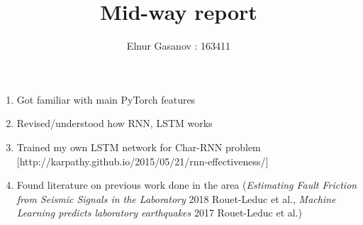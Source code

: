 \documentclass{article}
\author{Elnur Gasanov : 163411}
\title{Mid-way report}
\date{}
\begin{document}
\maketitle

\begin{enumerate}
	\item Got familiar with main PyTorch features
	\item Revised/understood how RNN, LSTM works
	\item Trained my own LSTM network for Char-RNN problem [http://karpathy.github.io/2015/05/21/rnn-effectiveness/]
	\item Found literature on previous work done in the area (\textit{Estimating Fault Friction from Seismic Signals in the Laboratory} 2018 Rouet-Leduc et al., \textit{Machine Learning predicts laboratory earthquakes} 2017 Rouet-Leduc et al.)
		
\end{enumerate}
\end{document}
